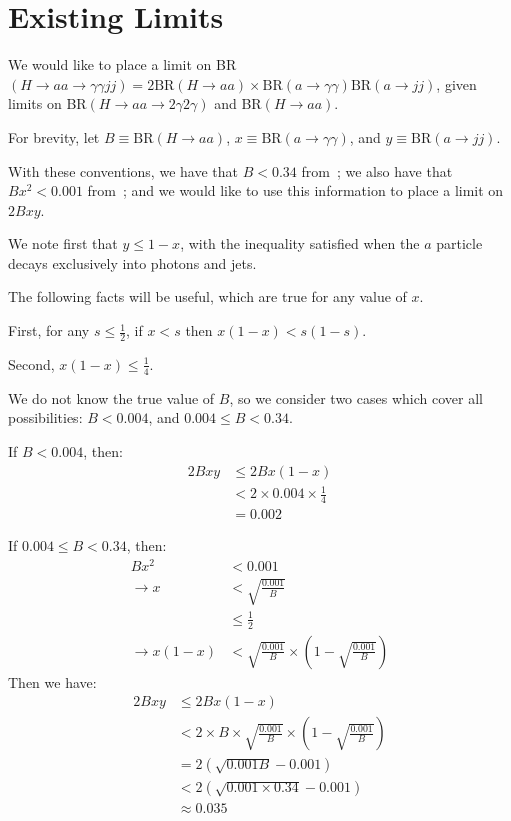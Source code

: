 \section{Existing Limits}
\label{sec:HBSM_app:existinglimits}
We would like to place a limit on BR$(H\rightarrow aa\rightarrow \gamma\gamma jj) = 2\text{BR}(H\rightarrow aa)\times\text{BR}(a\rightarrow\gamma\gamma)\text{BR}(a\rightarrow jj)$,
given limits on BR$(H\rightarrow aa\rightarrow 2\gamma2\gamma)$ and BR$(H\rightarrow aa)$.

\noindent For brevity, let $B\equiv \text{BR}(H\rightarrow aa)$, $x\equiv \text{BR}(a\rightarrow\gamma\gamma)$, and $y\equiv \text{BR}(a\rightarrow jj)$.

\noindent With these conventions, we have that $B<0.34$ from~\cite{Khachatryan:2016vau}; we also have that $Bx^2<0.001$ from~\cite{Aad:2015bua}; and we would like to use this information to place a limit on $2Bxy$. 

\noindent We note first that $y\le 1-x$, with the inequality satisfied when the $a$ particle decays exclusively into photons and jets.

\noindent The following facts will be useful, which are true for any value of $x$.

\noindent First, for any $s\le\frac{1}{2}$, if $x<s$ then $x(1-x)<s(1-s)$.

\noindent Second, $x(1-x)\le \frac{1}{4}$.

\noindent We do not know the true value of $B$,
so we consider two cases which cover all possibilities: $B<0.004$, and $0.004\le B<0.34$.

\noindent If $B<0.004$, then:
\begin{align*}
2Bxy &\le 2Bx(1-x) \\
&<2\times0.004\times\frac{1}{4} \\
&=0.002
\end{align*}

\noindent If $0.004\le B<0.34$, then: 
\begin{align*}
Bx^2 &< 0.001\\
\rightarrow x&<\sqrt{\frac{0.001}{B}}\\
&\le \frac{1}{2}\\
\rightarrow x(1-x)&<\sqrt{\frac{0.001}{B}}\times\left(1-\sqrt{\frac{0.001}{B}}\right)
\end{align*}
\noindent Then we have: 
\begin{align*}
2Bxy &\le 2Bx(1-x) \\
&<2\times B\times\sqrt{\frac{0.001}{B}}\times\left(1-\sqrt{\frac{0.001}{B}}\right) \\
&=2(\sqrt{0.001B}-0.001)\\
&<2(\sqrt{0.001\times0.34}-0.001)\\
&\approx 0.035
\end{align*}

